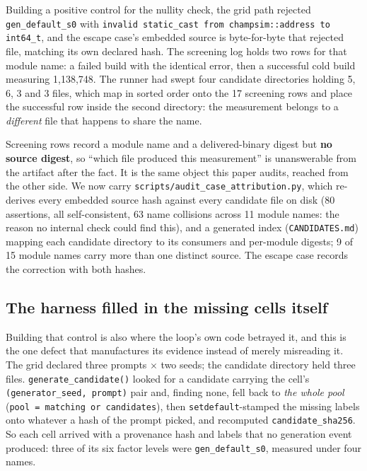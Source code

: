 \documentclass[10pt,twocolumn]{article}
\begin{document}
Building a positive control for the nullity check, the grid path rejected
\texttt{gen\_default\_s0} with \texttt{invalid static\_cast from champsim::address to
int64\_t}, and the escape case's embedded source is byte-for-byte that rejected file,
matching its own declared hash. The screening log holds two rows for that module name:
a failed build with the identical error, then a successful cold build measuring
1{,}138{,}748. The runner had swept four candidate directories holding 5, 6, 3 and 3
files, which map in sorted order onto the 17 screening rows and place the successful row
inside the second directory: the measurement belongs to a \emph{different} file that
happens to share the name.

Screening rows record a module name and a delivered-binary digest but \textbf{no source
digest}, so ``which file produced this measurement'' is unanswerable from the artifact
after the fact. It is the same object this paper audits, reached from the other side. We now
carry \texttt{scripts/audit\_case\_attribution.py}, which re-derives every embedded
source hash against every candidate file on disk (80 assertions, all self-consistent,
63 name collisions across 11 module names: the reason no internal check could find
this), and a generated index (\texttt{CANDIDATES.md}) mapping each candidate directory
to its consumers and per-module digests; 9 of 15 module names carry more than one
distinct source. The escape case records the correction with both hashes.

\subsection{The harness filled in the missing cells itself}
\label{sec:substitution}

Building that control is also where the loop's own code betrayed it, and this is the
one defect that manufactures its evidence instead of merely misreading it. The grid
declared three prompts $\times$ two seeds; the candidate directory held three files.
\texttt{generate\_candidate()} looked for a candidate carrying the cell's
\texttt{(generator\_seed, prompt)} pair and, finding none, fell back to \emph{the
whole pool} (\texttt{pool = matching or candidates}), then \texttt{setdefault}-stamped
the missing labels onto whatever a hash of the prompt picked, and recomputed
\texttt{candidate\_sha256}. So each cell arrived with a provenance hash and labels that
no generation event produced: three of its six factor levels were
\texttt{gen\_default\_s0}, measured under four names.
\end{document}
